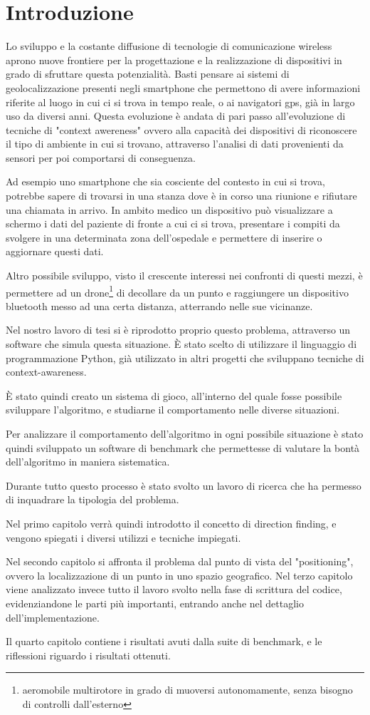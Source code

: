 \chapter*{Introduzione}
Lo sviluppo e la costante diffusione di tecnologie di comunicazione wireless aprono nuove frontiere per la progettazione e la realizzazione di dispositivi in grado di sfruttare questa potenzialità. Basti pensare ai sistemi di geolocalizzazione presenti negli smartphone che permettono di avere informazioni riferite al luogo in cui ci si trova in tempo reale, o ai navigatori gps, già in largo uso da diversi anni. Questa evoluzione è andata di pari passo all'evoluzione di tecniche di "context awereness" ovvero alla capacità dei dispositivi di riconoscere il tipo di ambiente in cui si trovano, attraverso l'analisi di dati provenienti da sensori per poi comportarsi di conseguenza. 

Ad esempio uno smartphone che sia cosciente del contesto in cui si trova, potrebbe sapere di trovarsi in una stanza dove è in corso una riunione e rifiutare una chiamata in arrivo. In ambito medico un dispositivo può visualizzare a schermo i dati del paziente di fronte a cui ci si trova, presentare i compiti da svolgere in una determinata zona dell'ospedale e permettere di inserire o aggiornare questi dati. 

Altro possibile sviluppo, visto il crescente interessi nei confronti di questi mezzi, è permettere ad un drone\footnote{aeromobile multirotore in grado di muoversi autonomamente, senza bisogno di controlli dall'esterno} di decollare da un punto e raggiungere un dispositivo bluetooth messo ad una certa distanza, atterrando nelle sue vicinanze. 

Nel nostro lavoro di tesi si è riprodotto proprio questo problema, attraverso un software che simula questa situazione. È stato scelto di utilizzare il linguaggio di programmazione Python, già utilizzato in altri progetti che sviluppano tecniche di context-awareness.

È stato quindi creato un sistema di gioco, all'interno del quale fosse possibile sviluppare l'algoritmo, e studiarne il comportamento nelle diverse situazioni. 

Per analizzare il comportamento dell'algoritmo in ogni possibile situazione è stato quindi sviluppato un software di benchmark che permettesse di valutare la bontà dell'algoritmo in maniera sistematica.

Durante tutto questo processo è stato svolto un lavoro di ricerca che ha permesso di inquadrare la tipologia del problema.

Nel primo capitolo verrà quindi introdotto il concetto di direction finding, e vengono spiegati i diversi utilizzi e tecniche impiegati. 

Nel secondo capitolo si affronta il problema dal punto di vista del "positioning", ovvero la localizzazione di un punto in uno spazio geografico. 
Nel terzo capitolo viene analizzato invece tutto il lavoro svolto nella fase di scrittura del codice, evidenziandone le parti più importanti, entrando anche nel dettaglio dell'implementazione. 

Il quarto capitolo contiene i risultati avuti dalla suite di benchmark, e le riflessioni riguardo i risultati ottenuti.